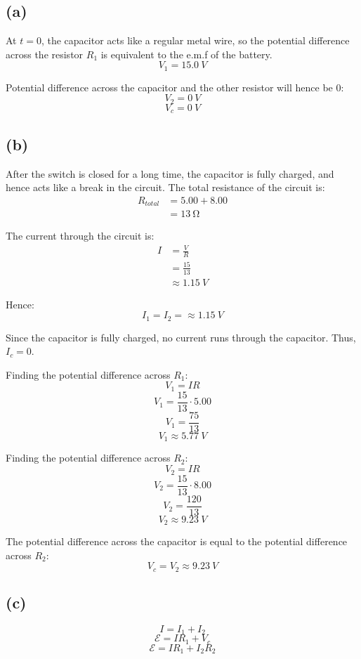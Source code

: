 \documentclass[11pt]{article}
\begin{document}
\subsection{(a)}
\label{sec:orgf17fa7e}
At \(t = 0\), the capacitor acts like a regular metal wire, so the potential difference across the resistor \(R_1\) is equivalent to the e.m.f of the battery.
\[V_1 = \qty{15.0}{\unit{V}}\]

Potential difference across the capacitor and the other resistor will hence be 0:
\[V_2 = \qty{0}{\unit{V}}\]
\[V_c = \qty{0}{\unit{V}}\]
\subsection{(b)}
\label{sec:orgc3616f5}
After the switch is closed for a long time, the capacitor is fully charged, and hence acts like a break in the circuit. The total resistance of the circuit is:
\begin{align*}
R_{total} &= 5.00 + 8.00 \\
&= \qty{13}{\unit{\ohm}}
\end{align*}

The current through the circuit is:
\begin{align*}
I &= \frac{V}{R} \\
&= \frac{15}{13} \\
&\approx \qty{1.15}{\unit{V}}
\end{align*}

Hence:
\[I_1 = I_2 = \approx \qty{1.15}{\unit{V}}\]

Since the capacitor is fully charged, no current runs through the capacitor. Thus, \(I_c = 0\).


Finding the potential difference across \(R_1\):
\[V_1 = IR\]
\[V_1 = \frac{15}{13} \cdot 5.00\]
\[V_1 = \frac{75}{13}\]
\[V_1 \approx \qty{5.77}{\unit{V}}\]

Finding the potential difference across \(R_2\):
\[V_2 = IR\]
\[V_2 = \frac{15}{13} \cdot 8.00\]
\[V_2 = \frac{120}{13}\]
\[V_2 \approx \qty{9.23}{\unit{V}}\]

The potential difference across the capacitor is equal to the potential difference across \(R_2\):
\[V_c = V_2 \approx \qty{9.23}{\unit{V}}\]
\subsection{(c)}
\label{sec:orgd54f4dc}
\[I = I_1 + I_2 \tag{1}\]
\[\mathcal{E} = IR_1 + V_c \tag{2}\]
\[\mathcal{E} = IR_1 + I_2R_2 \tag{3}\]
\end{document}
